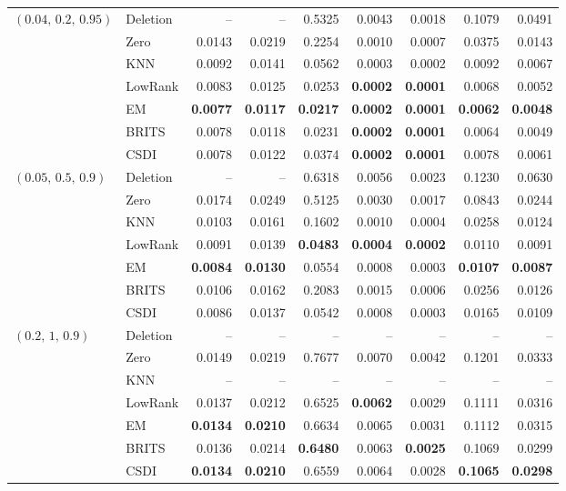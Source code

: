 \begin{table}[p]
\begin{tabular}{llrrrrrrr}
    \midrule
    $(0.04,\, 0.2,\, 0.95)$ & Deletion & -- & -- & 0.5325 & 0.0043 & 0.0018 & 0.1079 & 0.0491 \\
     & Zero & 0.0143 & 0.0219 & 0.2254 & 0.0010 & 0.0007 & 0.0375 & 0.0143 \\
     & KNN & 0.0092 & 0.0141 & 0.0562 & 0.0003 & 0.0002 & 0.0092 & 0.0067 \\
     & LowRank & 0.0083 & 0.0125 & 0.0253 & \textbf{0.0002} & \textbf{0.0001} & 0.0068 & 0.0052 \\
     & EM & \textbf{0.0077} & \textbf{0.0117} & \textbf{0.0217} & \textbf{0.0002} & \textbf{0.0001} & \textbf{0.0062} & \textbf{0.0048} \\
     & BRITS & 0.0078 & 0.0118 & 0.0231 & \textbf{0.0002} & \textbf{0.0001} & 0.0064 & 0.0049 \\
     & CSDI & 0.0078 & 0.0122 & 0.0374 & \textbf{0.0002} & \textbf{0.0001} & 0.0078 & 0.0061 \\
    \midrule
    $(0.05,\, 0.5,\, 0.9)$ & Deletion & -- & -- & 0.6318 & 0.0056 & 0.0023 & 0.1230 & 0.0630 \\
     & Zero & 0.0174 & 0.0249 & 0.5125 & 0.0030 & 0.0017 & 0.0843 & 0.0244 \\
     & KNN & 0.0103 & 0.0161 & 0.1602 & 0.0010 & 0.0004 & 0.0258 & 0.0124 \\
     & LowRank & 0.0091 & 0.0139 & \textbf{0.0483} & \textbf{0.0004} & \textbf{0.0002} & 0.0110 & 0.0091 \\
     & EM & \textbf{0.0084} & \textbf{0.0130} & 0.0554 & 0.0008 & 0.0003 & \textbf{0.0107} & \textbf{0.0087} \\
     & BRITS & 0.0106 & 0.0162 & 0.2083 & 0.0015 & 0.0006 & 0.0256 & 0.0126 \\
     & CSDI & 0.0086 & 0.0137 & 0.0542 & 0.0008 & 0.0003 & 0.0165 & 0.0109 \\
    \midrule
    $(0.2,\, 1,\, 0.9)$ & Deletion & -- & -- & -- & -- & -- & -- & -- \\
     & Zero & 0.0149 & 0.0219 & 0.7677 & 0.0070 & 0.0042 & 0.1201 & 0.0333 \\
     & KNN & -- & -- & -- & -- & -- & -- & -- \\
     & LowRank & 0.0137 & 0.0212 & 0.6525 & \textbf{0.0062} & 0.0029 & 0.1111 & 0.0316 \\
     & EM & \textbf{0.0134} & \textbf{0.0210} & 0.6634 & 0.0065 & 0.0031 & 0.1112 & 0.0315 \\
     & BRITS & 0.0136 & 0.0214 & \textbf{0.6480} & 0.0063 & \textbf{0.0025} & 0.1069 & 0.0299 \\
     & CSDI & \textbf{0.0134} & \textbf{0.0210} & 0.6559 & 0.0064 & 0.0028 & \textbf{0.1065} & \textbf{0.0298} \\
    \bottomrule
  \end{tabular}
\end{table}

